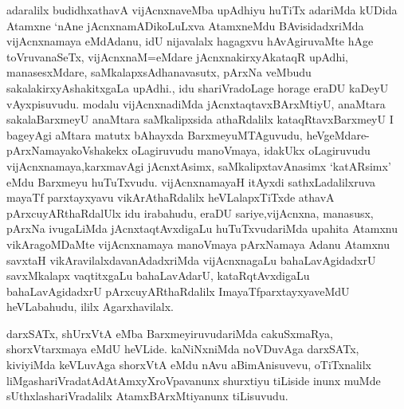 \begin{artha}
adaralilx budidhxathavA vijAcnxnaveMba upAdhiyu huTiTx adariMda kUDida Atamxne `nAne jAcnxnamADikoLuLxva AtamxneMdu BAvisidadxriMda vijAcnxnamaya eMdAdanu, idU nijavalalx hagagxvu hAvAgiruvaMte hAge toVruvanaSeTx, vijAcnxnaM=eMdare jAcnxnakirxyAkataqR upAdhi, manasesxMdare, saMkalapxsAdhanavasutx, pArxNa veMbudu sakalakirxyAshakitxgaLa upAdhi., idu shariVradoLage horage eraDU kaDeyU vAyxpisuvudu. modalu vijAcnxnadiMda jAcnxtaqtavxBArxMtiyU, anaMtara sakalaBarxmeyU anaMtara saMkalipxsida athaRdalilx kataqRtavxBarxmeyU I bageyAgi aMtara matutx bAhayxda BarxmeyuMTAguvudu, heVgeMdare-pArxNamayakoVshakekx oLagiruvudu manoVmaya, idakUkx oLagiruvudu vijAcnxnamaya,karxmavAgi jAcnxtAsimx, saMkalipxtavAnasimx `katARsimx' eMdu Barxmeyu huTuTxvudu. vijAcnxnamayaH itAyxdi sathxLadalilxruva mayaTf parxtayxyavu vikArAthaRdalilx heVLalapxTiTxde athavA pArxcuyARthaRdalUlx idu irabahudu, eraDU sariye,vijAcnxna, manasusx, pArxNa ivugaLiMda jAcnxtaqtAvxdigaLu huTuTxvudariMda upahita Atamxnu vikAragoMDaMte vijAcnxnamaya manoVmaya pArxNamaya Adanu Atamxnu savxtaH vikAravilalxdavanAdadxriMda vijAcnxnagaLu bahaLavAgidadxrU savxMkalapx vaqtitxgaLu bahaLavAdarU, kataRqtAvxdigaLu bahaLavAgidadxrU pArxcuyARthaRdalilx ImayaTfparxtayxyaveMdU heVLabahudu, ililx Agarxhavilalx.

darxSATx, shUrxVtA eMba BarxmeyiruvudariMda cakuSxmaRya, shorxVtarxmaya eMdU heVLide. kaNiNxniMda noVDuvAga darxSATx, kiviyiMda keVLuvAga shorxVtA eMdu nAvu aBimAnisuvevu, oTiTxnalilx liMgashariVradatAdAtAmxyXroVpavanunx shurxtiyu tiLiside inunx muMde sUthxlashariVradalilx AtamxBArxMtiyanunx tiLisuvudu.
\end{artha}

